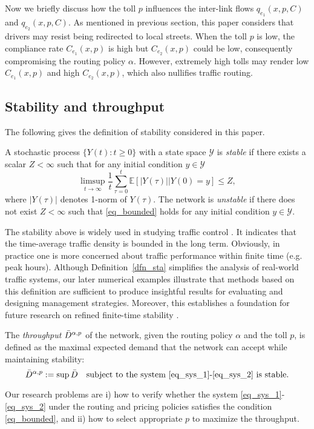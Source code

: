 Now we briefly discuss how the toll $p$ influences the inter-link flows $q_{e_1}(x, p, C)$ and $q_{e_2}(x, p, C)$. As mentioned in previous section, this paper considers that drivers may resist being redirected to local streets. When the toll $p$ is low, the compliance rate $C_{e_1}(x,p)$ is high but $C_{e_2}(x,p)$ could be low, consequently compromising the routing policy $\alpha$. However, extremely high tolls may render low $C_{e_1}(x,p)$ and high $C_{e_2}(x,p)$, which also nullifies traffic routing.  

\subsection{Stability and throughput}
The following gives the definition of stability considered in this paper. 
\begin{dfn} \label{dfn_sta}
A stochastic process $\{Y(t):t\geq0\}$ with a state space $\mathcal{Y}$ is \emph{stable} if there exists a scalar $Z<\infty$ such that for any initial condition $y\in\mathcal{Y}$
\begin{equation}\label{eq_bounded}
  \limsup_{t\to\infty}\frac{1}{t}\sum_{\tau=0}^t\mathbb {E}[|Y(\tau)||Y(0)=y] \le Z,
\end{equation}
where $|Y(\tau)|$ denotes 1-norm of $Y(\tau)$. The network is \emph{unstable} if there does not exist $Z<\infty$ such that \eqref{eq_bounded} holds for any initial condition $y\in\mathcal{Y}$.
\end{dfn}

The stability above is widely used in studying traffic control \cite{barman2023throughput}. It indicates that the time-average traffic density is bounded in the long term. Obviously, in practice one is more concerned about traffic performance within finite time (e.g. peak hours). Although Definition~\ref{dfn_sta} simplifies the analysis of real-world traffic systems, our later numerical examples illustrate that methods based on this definition are sufficient to produce insightful results for evaluating and designing management strategies. Moreover, this establishes a foundation for future research on refined finite-time stability \cite{hong2010finite}.

The \emph{throughput} $\Bar{D}^{\alpha,p}$ of the network, given the routing policy $\alpha$ and the toll $p$, is defined as the maximal expected demand that the network can accept while maintaining stability: 
\begin{equation*}
    \Bar{D}^{\alpha,p}:=\sup\Bar{D}\quad \text{subject to the system \eqref{eq_sys_1}-\eqref{eq_sys_2} is stable.} 
\end{equation*}

Our research problems are i) how to verify whether the system \eqref{eq_sys_1}-\eqref{eq_sys_2} under the routing and pricing policies satisfies the condition \eqref{eq_bounded}, and ii) how to select appropriate $p$ to maximize the throughput. 